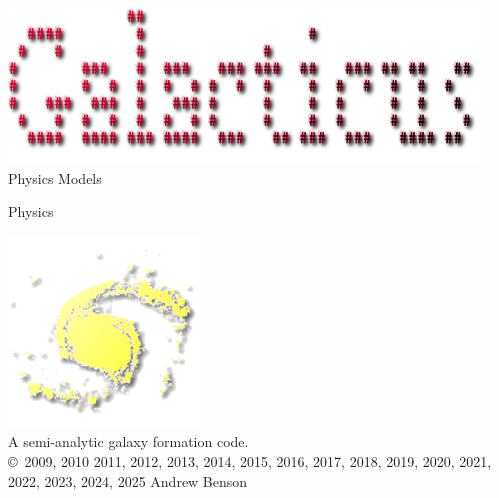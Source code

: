 \documentclass[letterpaper,10pt,headsepline]{scrbook}
\newcommand{\docname}{Physics}
\begin{document}
\lstset{language=[95]Fortran}

\frontmatter

\pagestyle{empty}
\begin{center}
\includegraphics[width=125mm]{GalacticusLogo.png}\\

\Huge Physics Models \normalsize

\docname

\includegraphics{New_Logo_Galaxy_192_Transparent.png}\\
A semi-analytic galaxy formation code.\\

\copyright\ 2009, 2010 2011, 2012, 2013, 2014, 2015, 2016, 2017, 2018, 2019, 2020, 2021, 2022, 2023, 2024, 2025 Andrew Benson
\end{center}

\tableofcontents

\mainmatter
\pagestyle{headings}







\backmatter




\printglossaries

\citeindextrue
\printindex
\end{document}
